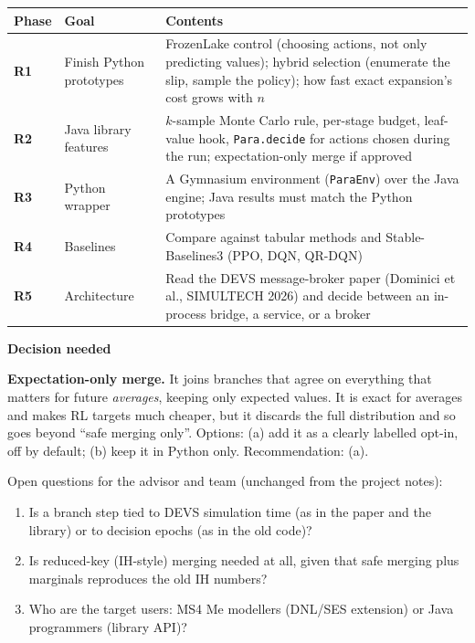 \documentclass[11pt]{article}
\newcommand{\code}[1]{\texttt{#1}}
\newcommand{\shadedbox}[3]{\par\smallskip\noindent\colorbox{#1}{\parbox{\dimexpr\linewidth-2\fboxsep}{\textbf{#2}\par #3}}\par\smallskip}
\newcommand{\decision}[1]{\shadedbox{warnbg}{Decision needed}{#1}}
\begin{document}
\begin{tabularx}{\linewidth}{@{}>{\bfseries}p{1.4cm}>{\raggedright}p{3.7cm}Y@{}}
\toprule
Phase & Goal & Contents\\
\midrule
R1 & Finish Python prototypes & FrozenLake control (choosing actions, not only predicting values); hybrid selection
  (enumerate the slip, sample the policy); how fast exact expansion's cost grows with $n$\\
R2 & Java library features & $k$-sample Monte Carlo rule, per-stage budget, leaf-value hook, \code{Para.decide}
  for actions chosen during the run; expectation-only merge if approved\\
R3 & Python wrapper & A Gymnasium environment (\code{ParaEnv}) over the Java engine; Java results must match the
  Python prototypes\\
R4 & Baselines & Compare against tabular methods and Stable-Baselines3 (PPO, DQN, QR-DQN)\\
R5 & Architecture & Read the DEVS message-broker paper (Dominici et al., SIMULTECH 2026) and decide between an
  in-process bridge, a service, or a broker\\
\bottomrule
\end{tabularx}

\decision{\textbf{Expectation-only merge.} It joins branches that agree on everything that matters for future
\emph{averages}, keeping only expected values. It is exact for averages and makes RL targets much cheaper, but it
discards the full distribution and so goes beyond ``safe merging only''. Options: (a) add it as a clearly labelled
opt-in, off by default; (b) keep it in Python only. Recommendation: (a).}

Open questions for the advisor and team (unchanged from the project notes):
\begin{enumerate}
\item Is a branch step tied to DEVS simulation time (as in the paper and the library) or to decision epochs (as in the
  old code)?
\item Is reduced-key (IH-style) merging needed at all, given that safe merging plus marginals reproduces the old IH
  numbers?
\item Who are the target users: MS4 Me modellers (DNL/SES extension) or Java programmers (library API)?
\end{enumerate}

\end{document}

